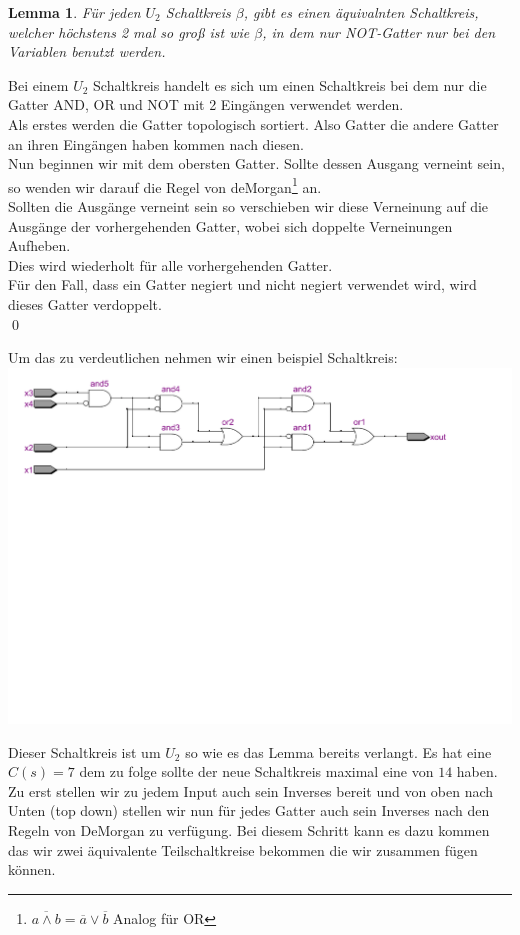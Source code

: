 \documentclass[a4paper,10pt]{article}
\newtheorem{lemma}{Lemma}
\begin{document}
\begin{lemma}
	Für jeden $U_2$ Schaltkreis $\beta$, gibt es einen äquivalnten Schaltkreis, welcher höchstens
	2 mal so groß ist wie $\beta$, in dem nur NOT-Gatter nur bei den Variablen benutzt werden.
\end{lemma}

Bei einem $U_2$ Schaltkreis handelt es sich um einen Schaltkreis bei dem nur die Gatter AND, OR und NOT mit 2 Eingängen verwendet werden.\\

Als erstes werden die Gatter topologisch sortiert. Also Gatter die andere Gatter an ihren Eingängen haben kommen nach diesen.\\
Nun beginnen wir mit dem obersten Gatter. Sollte dessen Ausgang verneint sein, so wenden wir darauf die Regel von deMorgan\footnote{$\overline{a\land{}b}=\overline{a}\lor\overline{b}$ Analog für OR} an.\\
Sollten die Ausgänge verneint sein so verschieben wir diese Verneinung auf die Ausgänge der vorhergehenden Gatter, wobei sich doppelte Verneinungen Aufheben.\\
Dies wird wiederholt für alle vorhergehenden Gatter.\\
Für den Fall, dass ein Gatter negiert und nicht negiert verwendet wird, wird dieses Gatter verdoppelt.\\
\qed{}

Um das zu verdeutlichen nehmen wir einen beispiel Schaltkreis: \\

\includegraphics[scale=0.50]{images/ursk.pdf}

Dieser Schaltkreis ist um $U_2$ so wie es das Lemma bereits verlangt.
Es hat eine $C(s) = 7$ dem zu folge sollte der neue Schaltkreis maximal eine von $14$ haben.
Zu erst stellen wir zu jedem Input auch sein Inverses bereit und von oben nach Unten (top down) stellen wir nun
f\"ur jedes Gatter auch sein Inverses nach den Regeln von DeMorgan zu verf\"ugung.
Bei diesem Schritt kann es dazu kommen das wir zwei \"aquivalente Teilschaltkreise bekommen die wir zusammen f\"ugen k\"onnen. \\
\end{document}
